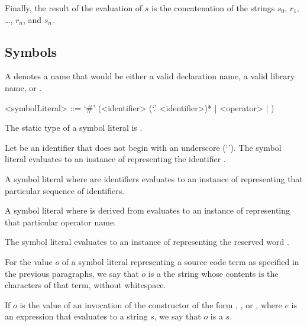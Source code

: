 \documentclass[makeidx]{article}
\begin{document}
{\LMHash{}%
Finally, the result of the evaluation of $s$ is
the concatenation of the strings $s_0$, $r_1$, \ldots, $r_n$, and $s_n$.


\subsection{Symbols}

\LMHash{}%
A 
denotes a name that would be either
a valid declaration name, a valid library name, or \VOID.

\begin{grammar}
<symbolLiteral> ::=
  `#' (<identifier> (`.' <identifier>)* | <operator> | \VOID)
\end{grammar}

\LMHash{}%
The static type of a symbol literal is .

\LMHash{}%
Let \id{} be an identifier that does not begin with an underscore
(`\code{\_}').
The symbol literal \code{\#\id}
evaluates to an instance of 
representing the identifier \id.

\LMHash{}%
A symbol literal 
where  are identifiers
evaluates to an instance of 
representing that particular sequence of identifiers.

\LMHash{}%
A symbol literal 
where  is derived from 
evaluates to an instance of 
representing that particular operator name.

\LMHash{}%
The symbol literal 
evaluates to an instance of 
representing the reserved word \VOID.

\LMHash{}%
For the value $o$ of a symbol literal representing a source code term
as specified in the previous paragraphs, we say that $o$ is a
the string whose contents is the characters of that term, without whitespace.


\LMHash{}%
If $o$ is the value of an invocation of the  constructor
of the form
, ,
or ,
where $e$ is an expression
that evaluates to a string $s$,
we say that $o$ is a  $s$.

}
\end{document}
